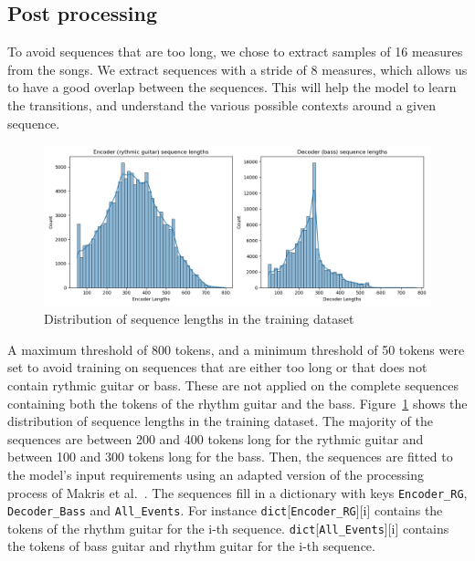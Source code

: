 \subsection{Post processing}

To avoid sequences that are too long, we chose to extract samples of 16 measures from the songs.
We extract sequences with a stride of 8 measures, which allows us to have a good overlap between the sequences.
This will help the model to learn the transitions, and understand the various possible contexts around a given sequence.

\begin{figure}[!ht]
    \centering
    \includegraphics[width=.8\linewidth]{../images-figures/sequence_lengths_16_8_800_50.png}
    \caption{Distribution of sequence lengths in the training dataset}
    \label{fig:sequence_length_distribution}
\end{figure}

A maximum threshold of 800 tokens, and a minimum threshold of 50 tokens were set to avoid training on sequences that are either too long or that does not contain rythmic guitar or bass.
These are not applied on the complete sequences containing both the tokens of the rhythm guitar and the bass.
Figure~\ref{fig:sequence_length_distribution} shows the distribution of sequence lengths in the training dataset.
The majority of the sequences are between 200 and 400 tokens long for the rythmic guitar and between 100 and 300 tokens long for the bass.
Then, the sequences are fitted to the model's input requirements using an adapted version of the processing process of Makris et al.~\cite{makris_conditional_2022}.
The sequences fill in a dictionary with keys \texttt{Encoder\_RG}, \texttt{Decoder\_Bass} and \texttt{All\_Events}.
For instance \texttt{dict}[\texttt{Encoder\_RG}][i] contains the tokens of the rhythm guitar for the i-th sequence.
\texttt{dict}[\texttt{All\_Events}][i] contains the tokens of bass guitar and rhythm guitar for the i-th sequence.


